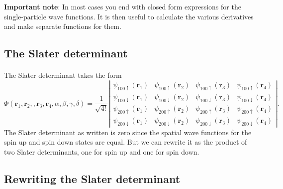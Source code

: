 \documentclass[%
twoside,                 %
final,                   %
10pt]{article}
\begin{document}
\textbf{Important note}: In most cases you end with closed form expressions for the single-particle  wave functions. It is then useful to calculate the various derivatives and make separate functions
for them.



\subsection*{The Slater determinant}

\paragraph{}

The Slater determinant takes the form  
\[
   \Phi(\mathbf{r}_1,\mathbf{r}_2,,\mathbf{r}_3,\mathbf{r}_4, \alpha,\beta,\gamma,\delta)=\frac{1}{\sqrt{4!}}
\left| \begin{array}{cccc} \psi_{100\uparrow}(\mathbf{r}_1)& \psi_{100\uparrow}(\mathbf{r}_2)& \psi_{100\uparrow}(\mathbf{r}_3)&\psi_{100\uparrow}(\mathbf{r}_4) \\
\psi_{100\downarrow}(\mathbf{r}_1)& \psi_{100\downarrow}(\mathbf{r}_2)& \psi_{100\downarrow}(\mathbf{r}_3)&\psi_{100\downarrow}(\mathbf{r}_4) \\
\psi_{200\uparrow}(\mathbf{r}_1)& \psi_{200\uparrow}(\mathbf{r}_2)& \psi_{200\uparrow}(\mathbf{r}_3)&\psi_{200\uparrow}(\mathbf{r}_4) \\
\psi_{200\downarrow}(\mathbf{r}_1)& \psi_{200\downarrow}(\mathbf{r}_2)& \psi_{200\downarrow}(\mathbf{r}_3)&\psi_{200\downarrow}(\mathbf{r}_4) \end{array} \right|.
\]
The Slater determinant as written is zero since the spatial wave functions for the spin up and spin down 
states are equal.  
But we can rewrite it as the product of two Slater determinants, one for spin up and one for spin down.



\subsection*{Rewriting the Slater determinant}

\end{document}
